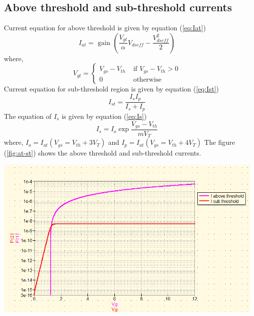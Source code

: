 \documentclass{article}
\begin{document}
\subsection{Above threshold and sub-threshold currents}
Current equation for above threshold is given by equation (\ref{eq:Iat})
\begin{equation}
    \label{eq:Iat}
    I_{at} = \text{ gain } (\frac{V_{gt}}{\alpha} V_{dseff} - \frac{V_{dseff}^2}{2})
\end{equation}
where,
$$V_{gt} = \begin{cases}
    V_{gs} - V_{th} &\text{ if } V_{gs} - V_{th} >0\\
    0 &\text{ otherwise }
\end{cases}$$
Current equation for sub-threshold region is given by equation (\ref{eq:Ist})
\begin{equation}
    \label{eq:Ist}
    I_{st} = \frac{I_{s}I_{p}}{I_{s}+I_{p}}
\end{equation}
The equation of $I_s$ is given by equation (\ref{eq:Is})
\begin{equation}
    \label{eq:Is}
    I_s = I_o \exp{\frac{V_{gs}-V_{th}}{m V_{T}}}
\end{equation}
where, $I_{o} = I_{at}(V_{gs} = V_{th} + 3V_T)$ and $I_{p} = I_{at}(V_{gs} = V_{th} + 4V_T) $
The figure (\ref{fig:at-st}) shows the above threshold and sub-threshold currents. 
\begin{center}
    \label{fig:at-st}
    \includegraphics[scale = 0.6]{../Images/22072024/Ids-at-st.png}
\end{center}
\newpage
\end{document}
